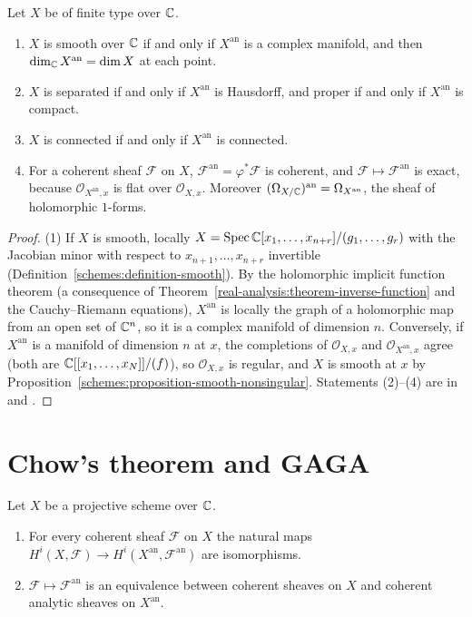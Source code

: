 \begin{proposition}\label{gaga:proposition-analytification-properties}
Let $X$ be of finite type over $\mathbb{C}$.
\begin{enumerate}
\item $X$ is smooth over $\mathbb{C}$ if and only if $X^{\mathrm{an}}$ is a complex manifold, and then $\dim_{\mathbb{C}} X^{\mathrm{an}} = \dim X$ at each point.
\item $X$ is separated if and only if $X^{\mathrm{an}}$ is Hausdorff, and proper if and only if $X^{\mathrm{an}}$ is compact.
\item $X$ is connected if and only if $X^{\mathrm{an}}$ is connected.
\item For a coherent sheaf $\mathcal{F}$ on $X$, $\mathcal{F}^{\mathrm{an}} = \varphi^*\mathcal{F}$ is coherent, and $\mathcal{F} \mapsto \mathcal{F}^{\mathrm{an}}$ is exact, because
$\mathcal{O}_{X^{\mathrm{an}}, x}$ is flat over $\mathcal{O}_{X,x}$. Moreover $(\Omega_{X/\mathbb{C}})^{\mathrm{an}} = \Omega_{X^{\mathrm{an}}}$, the sheaf of holomorphic $1$-forms.
\end{enumerate}
\end{proposition}

\begin{proof}
(1) If $X$ is smooth, locally $X = \operatorname{Spec}\mathbb{C}[x_1, \ldots, x_{n+r}]/(g_1, \ldots, g_r)$ with the Jacobian minor with respect to $x_{n+1}, \ldots, x_{n+r}$ invertible
(Definition~\ref{schemes:definition-smooth}). By the holomorphic implicit function theorem (a consequence of Theorem~\ref{real-analysis:theorem-inverse-function}
and the Cauchy--Riemann equations), $X^{\mathrm{an}}$ is locally the graph of a holomorphic map from an open set of $\mathbb{C}^n$, so it is a complex manifold of dimension
$n$. Conversely, if $X^{\mathrm{an}}$ is a manifold of dimension $n$ at $x$, the completions of $\mathcal{O}_{X,x}$ and $\mathcal{O}_{X^{\mathrm{an}},x}$ agree (both are
$\mathbb{C}[[x_1, \ldots, x_N]]/(f)$), so $\mathcal{O}_{X,x}$ is regular, and $X$ is smooth at $x$ by Proposition~\ref{schemes:proposition-smooth-nonsingular}. Statements (2)--(4)
are in \cite[Expos\'e XII]{sga1} and \cite[Section 2]{serre-gaga}.
\end{proof}

\section{Chow's theorem and GAGA}\label{gaga:section-gaga}

\begin{theorem}\label{gaga:theorem-gaga}
Let $X$ be a projective scheme over $\mathbb{C}$.
\begin{enumerate}
\item For every coherent sheaf $\mathcal{F}$ on $X$ the natural maps $H^i(X, \mathcal{F}) \to H^i(X^{\mathrm{an}}, \mathcal{F}^{\mathrm{an}})$ are isomorphisms.
\item $\mathcal{F} \mapsto \mathcal{F}^{\mathrm{an}}$ is an equivalence between coherent sheaves on $X$ and coherent analytic sheaves on $X^{\mathrm{an}}$.
\end{enumerate}
\end{theorem}

